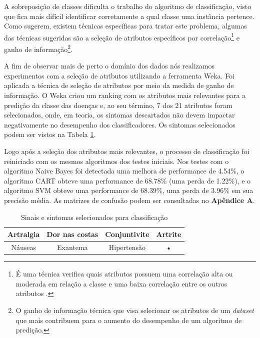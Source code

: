 A sobreposição de classes dificulta o trabalho do algoritmo de classificação, visto que fica mais difícil identificar corretamente a qual classe uma instância pertence. Como  sugerem, existem técnicas específicas para tratar este problema, algumas das técnicas sugeridas são a seleção de atributos específicos por correlação\footnote{É uma técnica verifica quais atributos possuem uma correlação alta ou moderada em relação a classe e uma baixa correlação entre os outros atributos .} e ganho de informação\footnote{O ganho de informação técnica que visa selecionar os atributos de um \textit{dataset} que mais contribuem para o aumento do desempenho de um algoritmo de predição.}.


A fim de observar mais de perto o domínio dos dados nós realizamos experimentos com a seleção de atributos utilizando a ferramenta Weka. Foi aplicada a técnica de seleção de atributos por meio da medida de ganho de informação. O Weka criou um ranking com os atributos mais relevantes para a predição da classe das doenças e, ao seu término,  7 dos 21 atributos foram selecionados, onde, em teoria, os sintomas descartados não devem impactar negativamente no desempenho dos classificadores. Os sintomas selecionados podem ser vistos na Tabela \ref{tab:7colunas}. 

Logo após a seleção dos atributos mais relevantes, o processo de classificação foi reiniciado com os mesmos algoritmos dos testes iniciais. Nos testes com o algoritmo Naive Bayes foi detectada uma melhora de performance de 4.54\%, o algoritmo CART obteve uma performance de 68.78\% (uma perda de 1.22\%), e o algoritmo SVM obteve uma performance de 68.39\%, uma perda de 3.96\% em sua precisão média. As matrizes de confusão podem ser consultadas no \textbf{Apêndice A}.


\begin{table}[h]
\begin{center}
\caption{\label{tab:7colunas}Sinais e sintomas selecionados para classificação}

\begin{tabular}{c|c|c|c}
\hline 
Artralgia & Dor nas costas & Conjuntivite & Artrite \\ 
\hline 
Náuseas & Exantema & Hipertensão & • \\ 
\hline 
\end{tabular} 


\end{center}
\end{table}
\newpage


